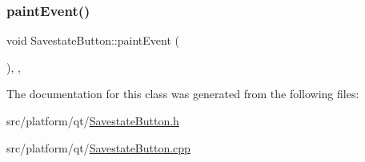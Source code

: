 \subsubsection{\texorpdfstring{paint\+Event()}{paintEvent()}}
{\footnotesize\ttfamily void Savestate\+Button\+::paint\+Event (\begin{DoxyParamCaption}\item[{Q\+Paint\+Event $\ast$}]{ }\end{DoxyParamCaption})\hspace{0.3cm}{\ttfamily [override]}, {\ttfamily [protected]}, {\ttfamily [virtual]}}



The documentation for this class was generated from the following files\+:\begin{DoxyCompactItemize}
\item 
src/platform/qt/\mbox{\hyperlink{_savestate_button_8h}{Savestate\+Button.\+h}}\item 
src/platform/qt/\mbox{\hyperlink{_savestate_button_8cpp}{Savestate\+Button.\+cpp}}\end{DoxyCompactItemize}
